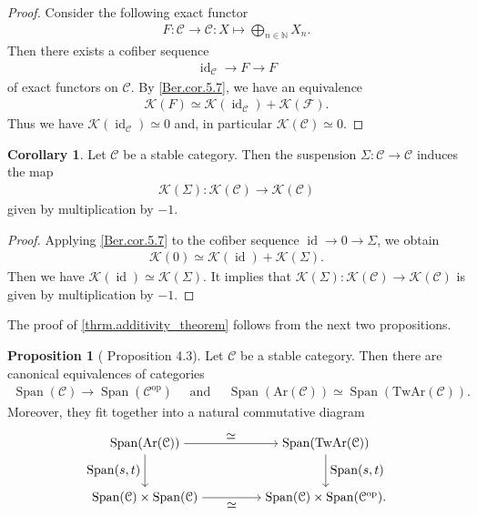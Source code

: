 \documentclass[a4paper,dvipdfmx,11pt,reqno]{amsart}
\DeclareMathOperator{\myop}{op}
\DeclareMathOperator{\id}{id}
\newcommand{\C}{\mathcal{C}}
\newcommand{\F}{\mathcal{F}}
\newcommand{\K}{\mathcal{K}}
\DeclareMathOperator{\Span}{Span}
\newcommand{\Ar}{\mathrm{Ar}}
\newcommand{\TwAr}{\mathrm{TwAr}}
\theoremstyle{definition}
\newtheorem{corollary}[theorem]{Corollary}
\newtheorem{proposition}[theorem]{Proposition}
\begin{document}
\begin{proof}
  Consider the following exact functor
  \begin{align*}
    F : \C \to \C : X \mapsto \bigoplus_{n \in \mathbb{N}} X_n .
  \end{align*}
  Then there exists a cofiber sequence 
  \begin{align*}
    \id_{\C} \to F \to F
  \end{align*}
  of exact functors on $\C$.
  By \cref{Ber.cor.5.7}, we have an equivalence 
  \begin{align*}
    \K(F) 
    \simeq \K(\id_{\C}) + \K(\F). 
  \end{align*}
  Thus we have $\K(\id_{\C}) \simeq 0$ and, in particular $\K(\C) \simeq 0$.
\end{proof}

\begin{corollary} \label{Ber.cor.5.8}
  Let $\C$ be a stable category.
  Then the suspension $\Sigma : \C \to \C$ induces the map 
  \begin{align*}
    \K(\Sigma) : \K(\C) \to \K(\C) 
  \end{align*}
  given by multiplication by $-1$.
\end{corollary}

\begin{proof}
  Applying \cref{Ber.cor.5.7} to the cofiber sequence $\id \to 0 \to \Sigma$, we obtain 
  \begin{align*}
    \K(0) 
    \simeq \K(\id) + \K(\Sigma).
  \end{align*}
  Then we have $\K(\id) \simeq \K(\Sigma)$.
  It implies that $\K(\Sigma) : \K(\C) \to \K(\C)$ is given by multiplication by $-1$.
\end{proof}

The proof of \cref{thrm.additivity_theorem} follows from the next two propositions.

\begin{proposition}[\cite{HLS23} Proposition 4.3] \label{HLS23.prop.4.3}
  Let $\C$ be a stable category.
  Then there are canonical equivalences of categories
  \begin{align*}
    \Span(\C) \to \Span(\C^{\myop}) 
    \quad \text{ and } \quad 
    \Span(\Ar(\C)) \simeq \Span(\TwAr(\C)).
  \end{align*}
  Moreover, they fit together into a natural commutative diagram 
  \[\begin{tikzpicture}[auto,->] 
    \node (tl) at (0,1.5) {$\Span(\Ar(\C))$}; 
    \node (tr) at (5,1.5) {$\Span(\TwAr(\C))$};
    \node (bl) at (0,0) {$\Span(\C) \times \Span(\C)$}; 
    \node (br) at (5,0) {$\Span(\C) \times \Span(\C^{\myop}).$}; 
    \draw (tl) -- node {$\simeq$} (tr); 
    \draw (bl) -- node[swap] {$\simeq$} (br); 
    \draw (tl) -- node[swap] {$\Span(s,t)$} (bl);
    \draw (tr) -- node {$\Span(s,t)$} (br); 
  \end{tikzpicture}\]
\end{proposition}
\end{document}
